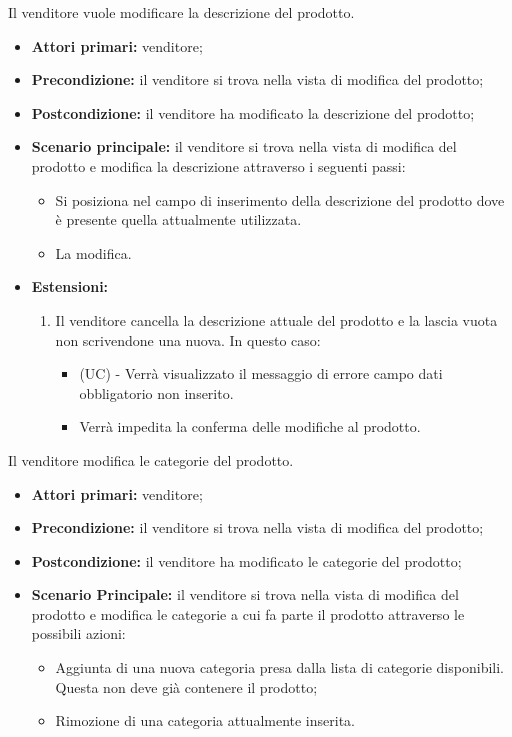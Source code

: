Il venditore vuole modificare la descrizione del prodotto.
\begin{itemize}
    \item \textbf{Attori primari:} venditore;
    \item \textbf{Precondizione:} il venditore si trova nella vista di modifica del prodotto;
    \item \textbf{Postcondizione:} il venditore ha modificato la descrizione del prodotto;
    \item \textbf{Scenario principale:} il venditore si trova nella vista di modifica del prodotto e modifica la descrizione attraverso i seguenti passi:
    \begin{itemize}
        \item Si posiziona nel campo di inserimento della descrizione del prodotto dove è presente quella attualmente utilizzata.
        \item La modifica.
    \end{itemize}
    \item \textbf{Estensioni:}
    \begin{enumerate}
    	\item Il venditore cancella la descrizione attuale del prodotto e la lascia vuota non scrivendone una nuova. In questo caso:
    	\begin{itemize}
    		\item (UC) - Verrà visualizzato il messaggio di errore campo dati obbligatorio non inserito.
    		\item Verrà impedita la conferma delle modifiche al prodotto.
    	\end{itemize}
    \end{enumerate}
\end{itemize}

Il venditore modifica le categorie del prodotto.
\begin{itemize}
    \item \textbf{Attori primari:} venditore;
    \item \textbf{Precondizione:} il venditore si trova nella vista di modifica del prodotto;
    \item \textbf{Postcondizione:} il venditore ha modificato le categorie del prodotto;
    \item \textbf{Scenario Principale:} il venditore si trova nella vista di modifica del prodotto e modifica le categorie a cui fa parte il prodotto attraverso le possibili azioni:
    \begin{itemize}
        \item Aggiunta di una nuova categoria presa dalla lista di categorie disponibili. Questa non deve già contenere il prodotto;
        \item Rimozione di una categoria attualmente inserita.
    \end{itemize}
\end{itemize}

